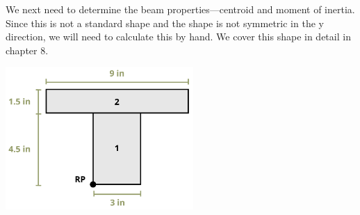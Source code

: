 \documentclass[
  letterpaper,
  DIV=11,
  numbers=noendperiod]{scrreprt}
\theoremstyle{definition}
\theoremstyle{remark}
\begin{document}
\begin{tcolorbox}
\begin{tcolorbox}
We next need to determine the beam properties---centroid and moment of
inertia. Since this is not a standard shape and the shape is not
symmetric in the y direction, we will need to calculate this by hand. We
cover this shape in detail in chapter 8.

\begin{center}
\includegraphics[width=2.8125in,height=\textheight]{images/CH9 PNGs/Example 9.1 part 3.png}
\end{center}


\end{tcolorbox}
\end{tcolorbox}
\end{document}

